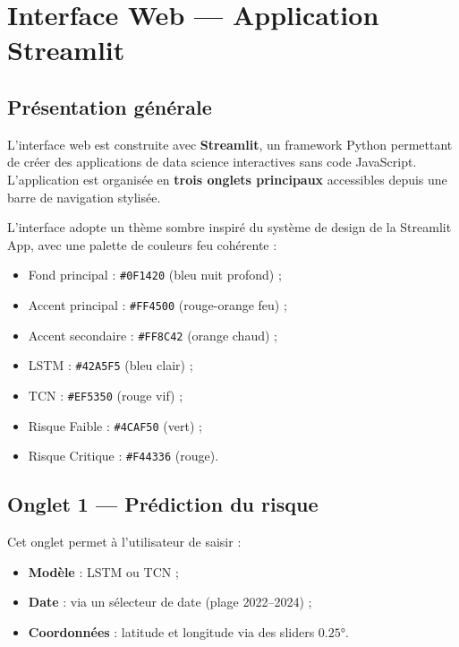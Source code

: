 \documentclass[12pt,a4paper]{report}
\begin{document}
\clearpage

\chapter{Interface Web — Application Streamlit}
\label{chap:app}

\section{Présentation générale}

L'interface web est construite avec \textbf{Streamlit}, un framework Python permettant
de créer des applications de data science interactives sans code JavaScript. L'application
est organisée en \textbf{trois onglets principaux} accessibles depuis une barre de
navigation stylisée.

\begin{infobox}[title=Design System de l'interface]
L'interface adopte un thème sombre inspiré du système de design de la Streamlit App,
avec une palette de couleurs feu cohérente :
\begin{itemize}[leftmargin=*,itemsep=2pt]
  \item Fond principal : \texttt{\#0F1420} (bleu nuit profond) ;
  \item Accent principal : \texttt{\#FF4500} (rouge-orange feu) ;
  \item Accent secondaire : \texttt{\#FF8C42} (orange chaud) ;
  \item LSTM : \texttt{\#42A5F5} (bleu clair) ;
  \item TCN : \texttt{\#EF5350} (rouge vif) ;
  \item Risque Faible : \texttt{\#4CAF50} (vert) ;
  \item Risque Critique : \texttt{\#F44336} (rouge).
\end{itemize}
\end{infobox}

\section{Onglet 1 — Prédiction du risque}

Cet onglet permet à l'utilisateur de saisir :
\begin{itemize}[leftmargin=*]
  \item \textbf{Modèle} : LSTM ou TCN ;
  \item \textbf{Date} : via un sélecteur de date (plage 2022–2024) ;
  \item \textbf{Coordonnées} : latitude et longitude via des sliders $0.25°$.
\end{itemize}
\end{document}
